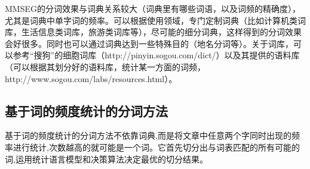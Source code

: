 \par MMSEG的分词效果与词典关系较大（词典里有哪些词语，以及词频的精确度），尤其是词典中单字词的频率。可以根据使用领域，专门定制词典（比如计算机类词库，生活信息类词库，旅游类词库等），尽可能的细分词典，这样得到的分词效果会好很多。同时也可以通过词典达到一些特殊目的（地名分词等）。关于词库，可以参考“搜狗”的细胞词库（http://pinyin.sogou.com/dict/）以及其提供的语料库（可以根据其划分好的语料库，统计某一方面的词频，http://www.sogou.com/labs/resources.html）。
\subsection{基于词的频度统计的分词方法}
\par 基于词的频度统计的分词方法不依靠词典,而是将文章中任意两个字同时出现的频率进行统计,次数越高的就可能是一个词。它首先切分出与词表匹配的所有可能的词,运用统计语言模型和决策算法决定最优的切分结果。
